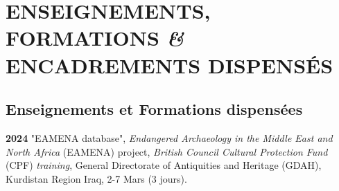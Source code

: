 \documentclass{article}
\newcommand{\fr}[1]{#1}       %
\newcommand{\en}[1]{}     %
\begin{document}
\section*{\fr{ENSEIGNEMENTS, FORMATIONS \textit{\&} ENCADREMENTS DISPENSÉS}\en{TEACHING, TRAINING \textit{\&} SUPERVISION ACTIVITIES}}

\subsection*{\fr{Enseignements et Formations dispensées}\en{Teaching and Training activities}}

\textbf{2024}
\fr{"EAMENA database", \textit{Endangered Archaeology in the Middle East and North Africa} (EAMENA) project, \textit{British Council Cultural Protection Fund} (CPF) \textit{training}, General Directorate of Antiquities and Heritage (GDAH), Kurdistan Region Iraq, 2-7 Mars (3 jours).}
\en{"EAMENA database", \textit{Endangered Archaeology in the Middle East and North Africa} (EAMENA) project, \textit{British Council Cultural Protection Fund} (CPF) \textit{training}, General Directorate of Antiquities and Heritage (GDAH), Kurdistan Region Iraq, March 2-7 (3 days).}
\end{document}
